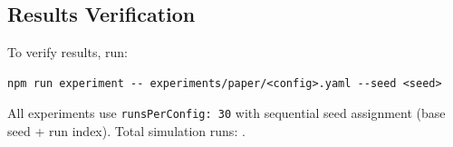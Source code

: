 \subsection{Results Verification}

To verify results, run:
\begin{verbatim}
npm run experiment -- experiments/paper/<config>.yaml --seed <seed>
\end{verbatim}

All experiments use \texttt{runsPerConfig: 30} with sequential seed assignment (base seed + run index). Total simulation runs: \totalruns{}.
